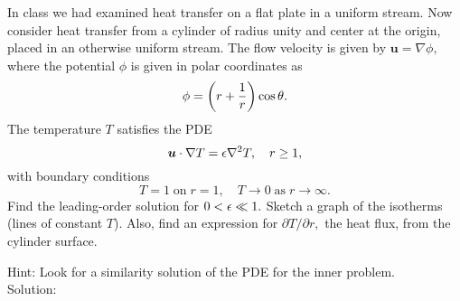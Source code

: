 \item In class we had examined heat transfer on a flat plate in a uniform stream.  Now consider heat transfer from a cylinder of radius unity and center at the origin, placed in an otherwise uniform stream.  The flow velocity is given by $\bm u = \nabla \phi,$ where the potential $\phi$ is given in polar coordinates as
\begin{equation*}
\phi = \left(r+\frac{1}{r}  \right) \cos \theta.
\end{equation*}
The temperature $T$ satisfies the PDE
\begin{equation*}
\bm u \cdot \nabla T = \epsilon \nabla^2 T, \quad r \ge 1,
\end{equation*}
with boundary conditions
\begin{equation*}
T = 1 \;\text{on}\; r=1, \quad T \to 0 \; \text{as}\; r \to \infty.
\end{equation*}
Find the leading-order solution for $0 < \epsilon \ll 1.$  Sketch a graph of the isotherms (lines of constant $T$).  Also, find an expression for $\partial T/\partial r,$ the heat flux, from the cylinder surface.

\n Hint:  Look for a similarity solution of the PDE for the inner problem.\\

Solution:\\


